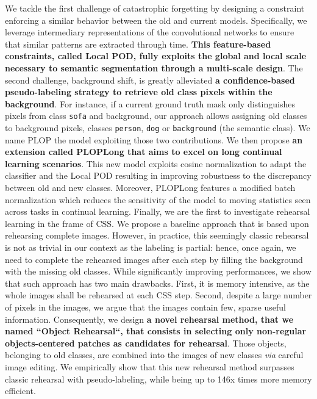 We tackle the first challenge of catastrophic forgetting by designing a constraint enforcing a
similar behavior between the old and current models. Specifically, we leverage intermediary
representations of the convolutional networks to ensure that similar patterns are extracted through
time. \textbf{This feature-based constraints, called Local POD, fully exploits the global and local
    scale necessary to semantic segmentation through a multi-scale design}. The second challenge,
background shift, is greatly alleviated \textbf{a confidence-based pseudo-labeling strategy to
    retrieve old class pixels within the background}. For instance, if a current ground truth mask only
distinguishes pixels from class \texttt{sofa} and background, our approach allows assigning old
classes to background pixels, \eg classes \texttt{person}, \texttt{dog} or \texttt{background} (the
semantic class). We name PLOP the model exploiting those two contributions. We then propose
\textbf{an extension called PLOPLong that aims to excel on long continual learning scenarios}. This
new model exploits cosine normalization to adapt the classifier and the Local POD resulting in
improving robustness to the discrepancy between old and new classes. Moreover, PLOPLong features a
modified batch normalization which reduces the sensitivity of the model to moving statistics seen
across tasks in continual learning. Finally, we are the first to investigate rehearsal learning in
the frame of \ac{CSS}. We propose a baseline approach that is based upon rehearsing complete images.
However, in practice, this seemingly classic rehearsal is not as trivial in our context as the
labeling is partial: hence, once again, we need to complete the rehearsed images after each step by
filling the background with the missing old classes. While significantly improving performances, we
show that such approach has two main drawbacks. First, it is memory intensive, as the whole images
shall be rehearsed at each \ac{CSS} step. Second, despite a large number of pixels in the images,
we argue that the images contain few, sparse useful information. Consequently, we design \textbf{a
    novel rehearsal method, that we named ``Object Rehearsal``, that consists in selecting only
    non-regular objects-centered patches as candidates for rehearsal}. Those objects, belonging to old
classes, are combined into the images of new classes \textit{via} careful image editing. We
empirically show that this new rehearsal method surpasses classic rehearsal with pseudo-labeling,
while being up to 146x times more memory efficient.

